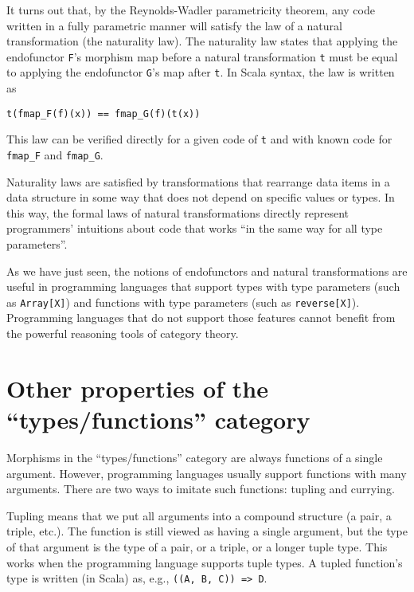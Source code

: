 It turns out that, by the Reynolds-Wadler parametricity theorem, any
code written in a fully parametric manner will satisfy the law of
a natural transformation (the naturality law). The naturality law
states that applying the endofunctor \lstinline!F!\textsf{'}s morphism map
before a natural transformation \lstinline!t! must be equal to applying
the endofunctor \lstinline!G!\textsf{'}s map after \lstinline!t!. In Scala
syntax, the law is written as
\begin{lstlisting}
t(fmap_F(f)(x)) == fmap_G(f)(t(x))
\end{lstlisting}
This law can be verified directly for a given code of \lstinline!t!
and with known code for \lstinline!fmap_F! and \lstinline!fmap_G!.

Naturality laws are satisfied by transformations that rearrange data
items in a data structure in some way that does not depend on specific
values or types. In this way, the formal laws of natural transformations
directly represent programmers\textsf{'} intuitions about code that works \textsf{``}in
the same way for all type parameters\textsf{''}.

As we have just seen, the notions of endofunctors and natural transformations
are useful in programming languages that support types with type parameters
(such as \lstinline!Array[X]!) and functions with type parameters
(such as \lstinline!reverse[X]!). Programming languages that do not
support those features cannot benefit from the powerful reasoning
tools of category theory.

\section{Other properties of the \textsf{``}types/functions\textsf{''} category}

Morphisms in the \textsf{``}types/functions\textsf{''} category are always functions
of a single argument. However, programming languages usually support
functions with many arguments. There are two ways to imitate such
functions: tupling and currying.

Tupling means that we put all arguments into a compound structure
(a pair, a triple, etc.). The function is still viewed as having a
single argument, but the type of that argument is the type of a pair,
or a triple, or a longer tuple type. This works when the programming
language supports tuple types. A tupled function\textsf{'}s type is written
(in Scala) as, e.g., \lstinline!((A, B, C)) => D!.

